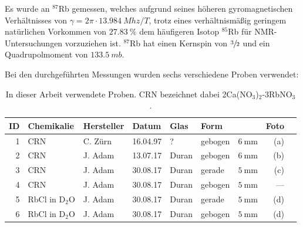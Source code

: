 Es wurde an $^\text{87}$Rb gemessen, welches aufgrund seines höheren gyromagnetischen Verhältnisses von $\gamma = 2\pi \cdot \SI{13.984}{Mhz / T}$, trotz eines verhältnismäßig geringem natürlichen Vorkommen von $\SI{27.83}{\percent}$ dem häufigeren Isotop $^\text{85}$Rb für NMR-Untersuchungen vorzuziehen ist. $^\text{87}$Rb hat einen Kernspin von $\sfrac{3}{2}$ und ein Quadrupolmoment von $\SI{133.5}{mb}$.

Bei den durchgeführten Messungen wurden sechs verschiedene Proben verwendet:

\begin{table}[H]
	\centering
	\begin{tabular}{rllllllrl}
		\hline
		ID & Chemikalie & Hersteller & Datum & Glas & Form & \diameter & Foto \\ 
		\hline
		1	& CRN &	C. Zürn &	16.04.97 &	? &	gebogen & 	$\SI{6}{\milli\meter}$ &	(a) \\
2	& CRN &	J. Adam &	13.07.17 &	Duran &	gebogen & 	$\SI{6}{\milli\meter}$ &	(b) \\
3	& CRN &	J. Adam &	30.08.17 &	Duran &	gerade & 	$\SI{5}{\milli\meter}$ &	(c) \\
4	& CRN &	J. Adam &	30.08.17 &	Duran &	gebogen & 	$\SI{5}{\milli\meter}$ &	--- \\
5	& RbCl in D$_\text{2}$O &	J. Adam &	30.08.17 &	Duran &	gerade & 	$\SI{5}{\milli\meter}$ &	(d) \\
6	& RbCl in D$_\text{2}$O &	J. Adam &	30.08.17 &	Duran &	gebogen & 	$\SI{5}{\milli\meter}$ &	(d) \\ \hline
	\end{tabular} 
	\caption{In dieser Arbeit verwendete Proben. CRN bezeichnet dabei 2Ca(NO$_\text{3}$)$_\text{2}$-3RbNO$_\text{3}$. \label{tab:exp:proben}}
\end{table}

